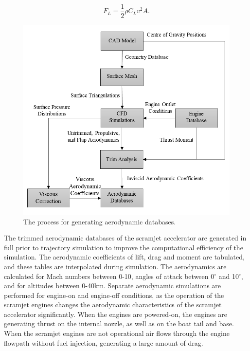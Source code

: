 \begin{equation}
F_L = \frac{1}{2}\rho C_L v^2 A .
\end{equation}


\begin{figure}[ht]
	\centering
	\includegraphics[width=0.7\linewidth]{figures/3_vehicle_design/FlowChart}
	\caption{The process for generating aerodynamic databases.}
	\label{fig:FlowChart}
\end{figure}

The trimmed aerodynamic databases of the scramjet accelerator are generated in full prior to trajectory simulation to improve the computational efficiency of the simulation. The aerodynamic coefficients of lift, drag and moment are tabulated, and these tables are interpolated during simulation. 
The aerodynamics are calculated for Mach numbers between 0-10, angles of attack between 0$^\circ$ and 10$^\circ$, and for altitudes between 0-40km. Separate aerodynamic simulations are performed for engine-on and engine-off conditions, as the operation of the scramjet engines changes the aerodynamic characteristics of the scramjet accelerator significantly. When the engines are powered-on, the engines are generating thrust on the internal nozzle, as well as on the boat tail and base.  When the scramjet engines are not operational air flows through the engine flowpath without fuel injection, generating a large amount of drag. 


